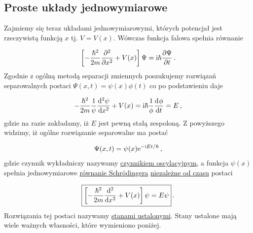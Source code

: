 \documentclass{myclass}
\begin{document}
\subsection{Proste układy jednowymiarowe}

Zajmiemy się teraz układami jednowymiarowymi, których potencjał jest rzeczywistą funkcją \(x\) tj.
\(V=V(x)\). Wówczas funkcja falowa spełnia równanie

\begin{equation*}
    \left[-\frac{\hbar^2}{2m}\pdv[2]{ }{x}+V(x)\right]\Psi=\mathrm{i}\hbar\pdv{\Psi}{t}\,.
\end{equation*}
Zgodnie z ogólną metodą separacji zmiennych poszukujemy rozwiązań separowalnych postaci
\(\Psi(x,t)=\psi(x)\phi(t)\) co po podstawieniu daje

\begin{equation*}
    -\frac{\hbar^2}{2m}\frac{1}{\psi}\dv[2]{\psi}{x}+V(x)=\mathrm{i}\hbar\frac{1}{\phi}\dv[]{\phi}{t}=E\,,
\end{equation*}
gdzie na razie zakładamy, iż \(E\) jest pewną stałą zespoloną. Z powyższego widzimy, iż ogólne
rozwiązanie separowalne ma postać

\begin{equation*}
    \Psi(x,t)=\psi(x)\mathrm{e}^{-\mathrm{i} Et/\hbar}\,,
\end{equation*}
gdzie czynnik wykładniczy nazywamy \underline{czynnikiem oscylacyjnym}, a funkcja \(\psi(x)\)
spełnia jednowymiarowe \underline{równanie Schr{\"o}dingera} \underline{niezależne od czasu} postaci

\begin{equation*}
    \boxed{\left[-\frac{\hbar^2}{2m}\dv[2]{}{x}+V(x)\right]\psi=E\psi}\,.
\end{equation*}
Rozwiązania tej postaci nazywamy \underline{stanami ustalonymi}. Stany ustalone mają wiele ważnych
własności, które wymieniono poniżej.
\end{document}
